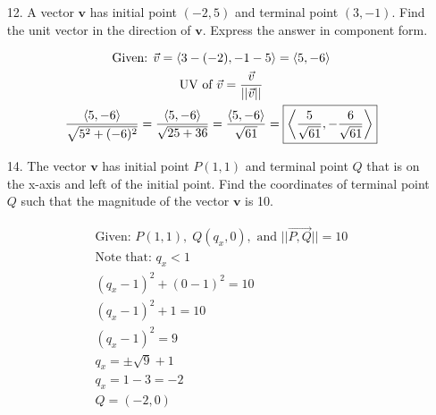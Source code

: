 \documentclass[10pt, letterpaper]{article}
\begin{document}
\begin{itemize}
        \item [12.] A vector $\mathbf{v}$ has initial point $(-2, 5)$ and terminal point $(3, -1)$. Find the unit vector in the direction of $\mathbf{v}$. Express the answer in component form.
        
        \begin{mdframed}
            \begin{equation*}
                \begin{gathered}
                    \text{Given: } \vec{v} = \expval{3 - (-2), -1 - 5} = \expval{5, -6}    \\
                    \text{UV of } \vec{v} = \frac{\vec{v}}{||\vec{v}||}                     \\
                    \frac{\expval{5, -6}}{\sqrt{5^2 + (-6)^2}} 
                    = \frac{\expval{5, -6}}{\sqrt{25 + 36}}
                    = \frac{\expval{5, -6}}{\sqrt{61}} 
                    = \boxed{\expval{\frac{5}{\sqrt{61}}, -\frac{6}{\sqrt{61}}}}
                \end{gathered}
            \end{equation*}
        \end{mdframed}

        \item [14.] The vector $\mathbf{v}$ has initial point $P(1, 1)$ and terminal point $Q$ that is on the x-axis and left of the initial point. Find the coordinates of terminal point $Q$ such that the magnitude of the vector $\mathbf{v}$ is 10.
        
        \begin{mdframed}
            \begin{equation*}
                \begin{gathered}
                    \text{Given: } P(1, 1),\; Q(q_{x}, 0), 
                    \text{ and } ||\vec{P, Q}|| = 10        \\
                    \text{Note that: } q_{x} < 1            \\
                    (q_{x} - 1)^2 + (0 - 1)^2 = 10          \\
                    (q_{x} - 1)^2 + 1 = 10                  \\
                    (q_{x} - 1)^2 = 9                       \\
                    q_{x} = \pm \sqrt{9} + 1                \\
                    q_{x} = 1 - 3 = -2                      \\
                    \boxed{Q = (-2, 0)}
                \end{gathered}
            \end{equation*}
        \end{mdframed}


\end{itemize}
\end{document}
